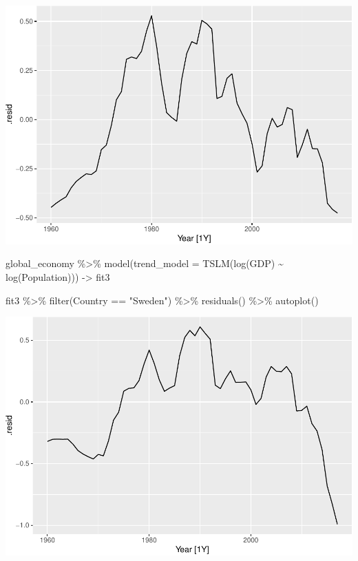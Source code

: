 \documentclass[
]{book}
\newenvironment{Shaded}{\begin{snugshade}}{\end{snugshade}}
\newcommand{\AttributeTok}[1]{\textcolor[rgb]{0.77,0.63,0.00}{#1}}
\newcommand{\FunctionTok}[1]{\textcolor[rgb]{0.00,0.00,0.00}{#1}}
\newcommand{\NormalTok}[1]{#1}
\newcommand{\OtherTok}[1]{\textcolor[rgb]{0.56,0.35,0.01}{#1}}
\newcommand{\SpecialCharTok}[1]{\textcolor[rgb]{0.00,0.00,0.00}{#1}}
\newcommand{\StringTok}[1]{\textcolor[rgb]{0.31,0.60,0.02}{#1}}
\begin{document}
\includegraphics{graphics/unnamed-chunk-64-1.pdf}

\begin{Shaded}
\begin{Highlighting}[]
\NormalTok{global\_economy }\SpecialCharTok{\%\textgreater{}\%} \FunctionTok{model}\NormalTok{(}\AttributeTok{trend\_model =} \FunctionTok{TSLM}\NormalTok{(}\FunctionTok{log}\NormalTok{(GDP) }\SpecialCharTok{\textasciitilde{}} \FunctionTok{log}\NormalTok{(Population))) }\OtherTok{{-}\textgreater{}}\NormalTok{ fit3}

\NormalTok{fit3 }\SpecialCharTok{\%\textgreater{}\%} \FunctionTok{filter}\NormalTok{(Country }\SpecialCharTok{==} \StringTok{"Sweden"}\NormalTok{) }\SpecialCharTok{\%\textgreater{}\%} \FunctionTok{residuals}\NormalTok{() }\SpecialCharTok{\%\textgreater{}\%} \FunctionTok{autoplot}\NormalTok{()}
\end{Highlighting}
\end{Shaded}

\includegraphics{graphics/unnamed-chunk-65-1.pdf}
\end{document}
